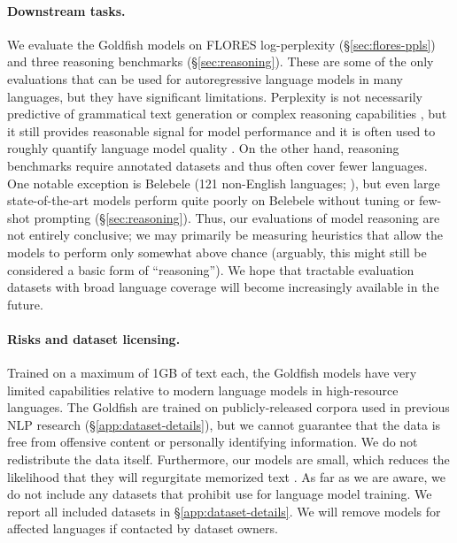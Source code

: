 \documentclass[11pt]{article}
\begin{document}
\paragraph{Downstream tasks.}
We evaluate the Goldfish models on FLORES log-perplexity (\S\ref{sec:flores-ppls}) and three reasoning benchmarks (\S\ref{sec:reasoning}).
These are some of the only evaluations that can be used for autoregressive language models in many languages, but they have significant limitations.
Perplexity is not necessarily predictive of grammatical text generation \citep{hu-etal-2020-systematic} or complex reasoning capabilities \citep{levy2024tasktokensimpactinput}, but it still provides reasonable signal for model performance \citep{xia-etal-2023-training} and it is often used to roughly quantify language model quality \citep{kaplan-etal-2020-scaling,hoffmann-etal-2022-training}.
On the other hand, reasoning benchmarks require annotated datasets and thus often cover fewer languages.
One notable exception is Belebele (121 non-English languages; \citealp{bandarkar2024belebele}), but even large state-of-the-art models perform quite poorly on Belebele without tuning or few-shot prompting (\S\ref{sec:reasoning}).
Thus, our evaluations of model reasoning are not entirely conclusive; we may primarily be measuring heuristics that allow the models to perform only somewhat above chance (arguably, this might still be considered a basic form of ``reasoning'').
We hope that tractable evaluation datasets with broad language coverage will become increasingly available in the future.

\paragraph{Risks and dataset licensing.}
Trained on a maximum of 1GB of text each, the Goldfish models have very limited capabilities relative to modern language models in high-resource languages.
The Goldfish are trained on publicly-released corpora used in previous NLP research (\S\ref{app:dataset-details}), but we cannot guarantee that the data is free from offensive content or personally identifying information.
We do not redistribute the data itself.
Furthermore, our models are small, which reduces the likelihood that they will regurgitate memorized text \citep{carlini2023quantifyingmemorizationneurallanguage}.
As far as we are aware, we do not include any datasets that prohibit use for language model training.
We report all included datasets in \S\ref{app:dataset-details}.
We will remove models for affected languages if contacted by dataset owners.
\end{document}
